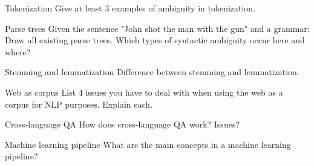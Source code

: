 \documentclass{article}
\author{Leopold Lemmermann}
\begin{document}
\createtitle



\begin{exercise}{Tokenization}
  Give at least 3 examples of ambiguity in tokenization.

  \begin{solution}
  \end{solution}
\end{exercise}

\begin{exercise}{Parse trees}
  Given the sentence "John shot the man with the gun" and a grammar: Draw all existing parse trees. Which types of syntactic ambiguity occur here and where?

  \begin{solution}
  \end{solution}
\end{exercise}

\begin{exercise}{Stemming and lemmatization}
  Difference between stemming and lemmatization.

  \begin{solution}
  \end{solution}
\end{exercise}

\begin{exercise}{Web as corpus}
  List 4 issues you have to deal with when using the web as a corpus for NLP purposes. Explain each.

  \begin{solution}
  \end{solution}
\end{exercise}

\begin{exercise}{Cross-language QA}
  How does cross-language QA work? Issues?

  \begin{solution}
  \end{solution}
\end{exercise}

\begin{exercise}{Machine learning pipeline}
  What are the main concepts in a machine learning pipeline?

  \begin{solution}
  \end{solution}
\end{exercise}
\end{document}
